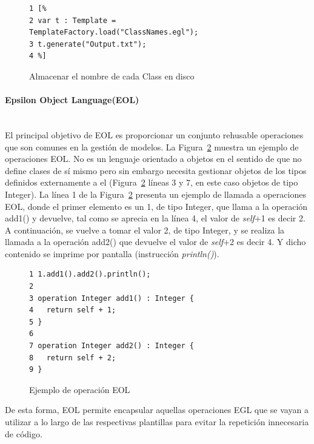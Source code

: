 \begin{figure}[tb!]
\begin{center}
\begin{footnotesize}
\begin{verbatim}
1 [%
2 var t : Template = TemplateFactory.load("ClassNames.egl");
3 t.generate("Output.txt");
4 %]
\end{verbatim}
\end{footnotesize}
\end{center}
\caption{Almacenar el nombre de cada Class en disco}
\label{back:code:template}
\end{figure}


\paragraph{Epsilon Object Language(EOL)} \ \\

El principal objetivo de EOL es proporcionar un conjunto rehusable operaciones que son comunes en la gestión de modelos. La Figura~\ref{back:code:eol} muestra un ejemplo de operaciones EOL. No es un lenguaje orientado a objetos en el sentido de que no define clases de sí mismo pero sin embargo necesita gestionar objetos de los tipos definidos externamente a el (Figura~\ref{back:code:eol} líneas 3 y 7, en este caso objetos de tipo Integer). La línea 1 de la Figura~\ref{back:code:eol} presenta un ejemplo de llamada a operaciones EOL, donde el primer elemento es un 1, de tipo Integer, que llama a la operación add1() y devuelve, tal como se aprecia en la línea 4, el valor de \emph{self}+1 es decir 2. A continuación, se vuelve a tomar el valor 2, de tipo Integer, y se realiza la llamada a la operación add2() que devuelve el valor de \emph{self}+2 es decir 4. Y dicho contenido se imprime por pantalla (instrucción \emph{println()}).

\begin{figure}[tb!]
\begin{center}
\begin{footnotesize}
\begin{verbatim}
1 1.add1().add2().println();
2
3 operation Integer add1() : Integer {
4   return self + 1;
5 }
6
7 operation Integer add2() : Integer {
8   return self + 2;
9 } 
\end{verbatim}
\end{footnotesize}
\end{center}
\caption{Ejemplo de operación EOL}
\label{back:code:eol}
\end{figure}

De esta forma, EOL permite encapsular aquellas operaciones EGL que se vayan a utilizar a lo largo de las respectivas plantillas para evitar la repetición innecesaria de código.